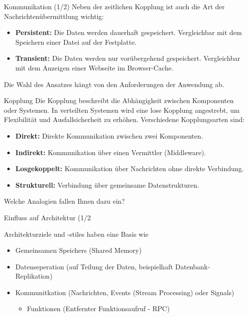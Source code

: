 \documentclass{beamer}
\begin{document}
\begin{frame}{Kommunikation (1/2)}
    Neben der zeitlichen Kopplung ist auch die Art der Nachrichtenübermittlung wichtig:
    \begin{itemize}
        \item \textbf{Persistent:} Die Daten werden dauerhaft gespeichert. Vergleichbar mit dem Speichern einer Datei auf der Festplatte.
        \item \textbf{Transient:} Die Daten werden nur vorübergehend gespeichert. Vergleichbar mit dem Anzeigen einer Webseite im Browser-Cache.
    \end{itemize}
    Die Wahl des Ansatzes hängt von den Anforderungen der Anwendung ab.
\end{frame}



\begin{frame}{Kopplung}
    Die Kopplung beschreibt die Abhängigkeit zwischen Komponenten oder Systemen. In verteilten Systemen wird eine lose Kopplung angestrebt, um Flexibilität und Ausfallsicherheit zu erhöhen. Verschiedene Kopplungsarten sind:
    \begin{itemize}
        \item \textbf{Direkt:} Direkte Kommunikation zwischen zwei Komponenten.
        \item \textbf{Indirekt:} Kommunikation über einen Vermittler (Middleware).
        \item \textbf{Losgekoppelt:} Kommunikation über Nachrichten ohne direkte Verbindung.
        \item \textbf{Strukturell:} Verbindung über gemeinsame Datenstrukturen.
    \end{itemize}
    Welche Analogien fallen Ihnen dazu ein?
\end{frame}


\begin{frame}{Einfluss auf Architektur (1/2}

Architekturziele und -stiles haben eine Basis wie
   \begin{itemize}
     \item Gemeinsamen Speichers (Shared Memory)
     \item Datenseperation (auf Teilung der Daten, beispielhaft Datenbank-
Replikation) 
      \item Kommunitkation (Nachrichten, Events (Stream Processing) oder Signals)
      \begin{itemize}
         \item Funktionen (Entfernter Funktionsaufruf - RPC) 
      \end{itemize}
    \end{itemize}
\end{frame}
\end{document}
